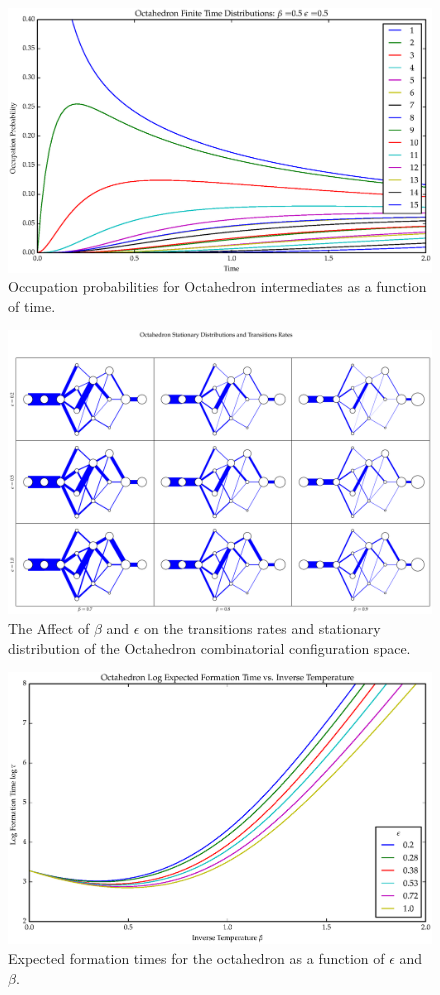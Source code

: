 \begin{figure}[ht]
\label{fig:OctaFinDist}
\centering
  \includegraphics[scale=0.6]{images/octahedron_finite_dist.eps}
\caption{Occupation probabilities for Octahedron intermediates as a function of time.}
\end{figure}

\begin{figure}[ht]
\label{fig:OctaPiGrid}
\centering
  \includegraphics[scale=0.22]{images/octahedron_pi_Q_grid.eps}
\caption{The Affect of $\beta$ and $\epsilon$ on the transitions rates and stationary distribution of the Octahedron combinatorial configuration space.}
\end{figure}

\begin{figure}[ht]
\label{fig:OctaTau}
\centering
  \includegraphics[scale=0.6]{images/octahedron_tau.eps}
\caption{Expected formation times for the octahedron as a function of $\epsilon$ and $\beta$.}
\end{figure}

